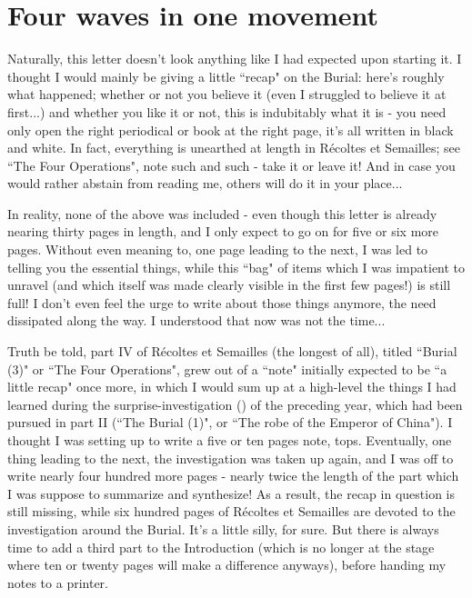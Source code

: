 \section{Four waves in one movement}

Naturally, this letter doesn't look anything like I had expected upon starting it. I thought I would mainly be giving a little ``recap" on the Burial: here's roughly what happened; whether or not you believe it (even I struggled to believe it at first...) and whether you like it or not, this is indubitably what it is - you need only open the right periodical or book at the right page, it's all written in black and white. In fact, everything is unearthed at length in R\'ecoltes et Semailles; see ``The Four Operations", note such and such - take it or leave it! And in case you would rather abstain from reading me, others will do it in your place...

In reality, none of the above was included - even though this letter is already nearing thirty pages in length, and I only expect to go on for five or six more pages. Without even meaning to, one page leading to the next, I was led to telling you the essential things, while this ``bag" of items which I was impatient to unravel (and which itself was made clearly visible in the first few pages!) is still full! I don't even feel the urge to write about those things anymore, the need dissipated along the way. I understood that now was not the time...

Truth be told, part IV of R\'ecoltes et Semailles (the longest of all), titled ``Burial (3)" or ``The Four Operations", grew out of a ``note" initially expected to be ``a little recap" once more, in which I would sum up at a high-level the things I had learned during the surprise-investigation () of the preceding year, which had been pursued in part II (``The Burial (1)", or ``The robe of the Emperor of China"). I thought I was setting up to write a five or ten pages note, tops. Eventually, one thing leading to the next, the investigation was taken up again, and I was off to write nearly four hundred more pages - nearly twice the length of the part which I was suppose to summarize and synthesize! As a result, the recap in question is still missing, while six hundred pages of R\'ecoltes et Semailles are devoted to the investigation around the Burial. It's a little silly, for sure. But there is always time to add a third part to the Introduction (which is no longer at the stage where ten or twenty pages will make a difference anyways), before handing my notes to a printer.

